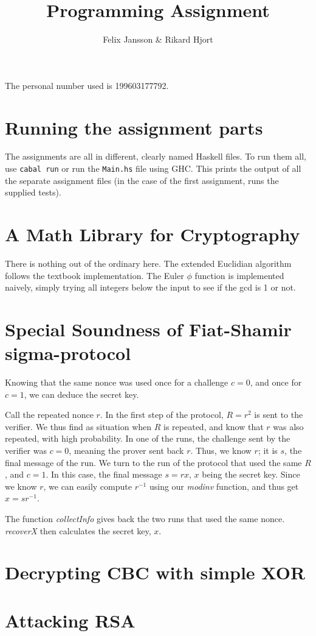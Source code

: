 \documentclass{article}
\author{Felix Jansson \& Rikard Hjort}
\title{Programming Assignment}
\begin{document}
The personal number used is 199603177792.

\section{Running the assignment parts}
The assignments are all in different, clearly named Haskell files. To run them
all, use \texttt{cabal run} or run the \texttt{Main.hs} file using GHC. This
prints the output of all the separate assignment files (in the case of the first
assignment, runs the supplied tests).

\section{A Math Library for Cryptography}
There is nothing out of the ordinary here. The extended Euclidian algorithm
follows the textbook implementation. The Euler $\phi$ function is implemented
naively, simply trying all integers below the input to see if the gcd is 1 or not.

\section{Special Soundness of Fiat-Shamir sigma-protocol}
Knowing that the same nonce was used once for a challenge $c=0$, and once for
$c=1$, we can deduce the secret key.

Call the repeated nonce $r$. In the first step of the protocol, $R=r^2$ is sent
to the verifier. We thus find as situation when $R$ is repeated, and know that
$r$ was also repeated, with high probability. In one of the runs, the
challenge sent by the verifier was $c=0$, meaning the prover sent back $r$.
Thus, we know $r$; it is $s$, the final message of the run. We turn to the run
of the protocol that used the same $R$, and $c=1$. In this case, the final
message $s=rx$, $x$ being the secret key. Since we know $r$, we can easily
compute $r^{-1}$ using our \textit{modinv} function, and thus get $x=sr^{-1}$.

The function \textit{collectInfo} gives back the two runs that used the same
nonce. \textit{recoverX} then calculates the
secret key, $x$.

\section{Decrypting CBC with simple XOR}


\section{Attacking RSA}
\end{document}
